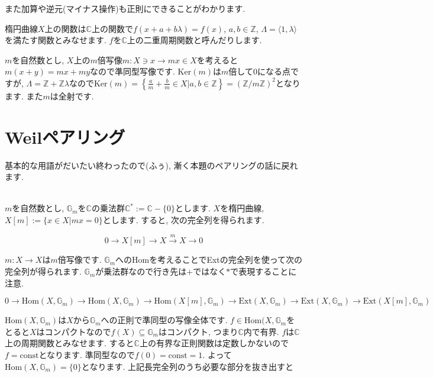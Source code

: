 \documentclass{jsarticle}
\def\Ker{\mathrm{Ker}}
\def\Hom{\mathrm{Hom}}
\def\Ext{\mathrm{Ext}}
\theoremstyle{definition}
\numberwithin{theorem}{section}
\begin{document}
また加算や逆元(マイナス操作)も正則にできることがわかります.

楕円曲線$X$上の関数は$\mathbb{C}$上の関数で$f(x+a+b\lambda) = f(x)$, $a, b \in\mathbb{Z}$, $\Lambda = \langle1, \lambda\rangle$を満たす関数とみなせます. $f$を$\mathbb{C}$上の二重周期関数と呼んだりします.

$m$を自然数とし, $X$上の$m$倍写像$m: X \ni x \rightarrow mx \in X$を考えると$m(x+y) = mx+my$なので準同型写像です. $\Ker(m)$は$m$倍して0になる点ですが, $\Lambda = \mathbb{Z} + \mathbb{Z}\lambda$なので$\Ker(m) = \left\{\frac{a}{m} + \frac{b}{m}\in X | a, b \in \mathbb{Z}\right\} = (\mathbb{Z}/m\mathbb{Z})^2$となります. また$m$は全射です. 

\section{Weilペアリング}
基本的な用語がだいたい終わったので(ふぅ), 漸く本題のペアリングの話に戻れます.

\hrulefill\\

$m$を自然数とし, $\mathbb{G}_m$を$\mathbb{C}$の乗法群$\mathbb{C}^* := \mathbb{C} - \{0\}$とします. $X$を楕円曲線, $X[m] := \{x \in X | mx = 0\}$とします. すると, 次の完全列を得られます. 

\begin{equation*}
0 \rightarrow X[m] \rightarrow X \xrightarrow{m} X \rightarrow 0
\end{equation*}

$m : X \rightarrow X$は$m$倍写像です. $\mathbb{G}_m$への$\Hom$を考えることでExtの完全列を使って次の完全列が得られます. 
$\mathbb{G}_m$が乗法群なので行き先は$+$ではなく$*$で表現することに注意. 

\begin{equation*}
0 \rightarrow \Hom(X, \mathbb{G}_m) \rightarrow \Hom(X, \mathbb{G}_m) \rightarrow \Hom(X[m], \mathbb{G}_m) \rightarrow \Ext(X, \mathbb{G}_m) \rightarrow \Ext(X, \mathbb{G}_m) \rightarrow \Ext(X[m], \mathbb{G}_m)
\end{equation*}

$\Hom(X, \mathbb{G}_m)$は$X$から$\mathbb{G}_m$への正則で準同型の写像全体です. $f\in\Hom(X, \mathbb{G}_m$をとると$X$はコンパクトなので$f(X) \subseteq\mathbb{G}_m$はコンパクト, つまり$\mathbb{C}$内で有界. $f$は$\mathbb{C}$上の周期関数とみなせます. すると$\mathbb{C}$上の有界な正則関数は定数しかないので$f = \mathrm{const}$となります. 準同型なので$f(0) = \mathrm{const} = 1$. よって$\Hom(X, \mathbb{G}_m) = \{0\}$となります. 上記長完全列のうち必要な部分を抜き出すと
\end{document}
